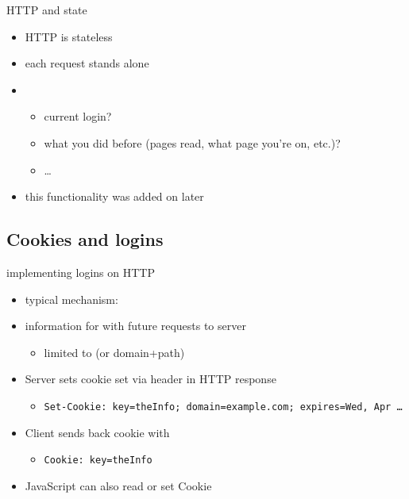 \begin{frame}{HTTP and state}
    \begin{itemize}
    \item HTTP is stateless
    \item each request stands alone
    \item {}
        \begin{itemize}
        \item current login?
        \item what you did before (pages read, what page you're on, etc.)?
        \item \ldots
        \end{itemize}
    \item this functionality was added on later
    \end{itemize}
\end{frame}

\subsection{Cookies and logins}

\begin{frame}{implementing logins on HTTP}
    \begin{itemize}
        \item typical mechanism: 
        \item information for  with future requests to server
        \begin{itemize}
            \item limited to  (or domain+path)
        \end{itemize}
    \item Server sets cookie set via header in HTTP response
        \begin{itemize}
            \item \texttt{\fontsize{10}{10}\selectfont Set-Cookie: key=theInfo; domain=example.com; expires=Wed, Apr \ldots}
        \end{itemize}
    \item Client sends back cookie with 
        \begin{itemize}
            \item \texttt{\fontsize{10}{10}\selectfont Cookie: key=theInfo}
        \end{itemize}
    \item JavaScript can also read or set Cookie
    \end{itemize}
\end{frame}

